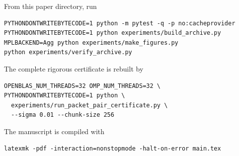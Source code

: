 \documentclass[11pt]{article}
\theoremstyle{definition}
\theoremstyle{remark}
\begin{document}
From this paper directory, run
\begin{verbatim}
PYTHONDONTWRITEBYTECODE=1 python -m pytest -q -p no:cacheprovider
PYTHONDONTWRITEBYTECODE=1 python experiments/build_archive.py
MPLBACKEND=Agg python experiments/make_figures.py
python experiments/verify_archive.py
\end{verbatim}
The complete rigorous certificate is rebuilt by
\begin{verbatim}
OPENBLAS_NUM_THREADS=32 OMP_NUM_THREADS=32 \
PYTHONDONTWRITEBYTECODE=1 python \
  experiments/run_packet_pair_certificate.py \
  --sigma 0.01 --chunk-size 256
\end{verbatim}
The manuscript is compiled with
\begin{verbatim}
latexmk -pdf -interaction=nonstopmode -halt-on-error main.tex
\end{verbatim}



\end{document}
